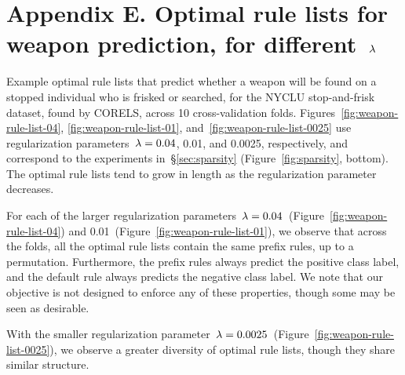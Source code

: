 \section*{Appendix E. Optimal rule lists for weapon prediction, for different~${\lambda}$}

Example optimal rule lists that predict whether a weapon will be found on a
stopped individual who is frisked or searched, for the NYCLU stop-and-frisk dataset,
found by CORELS, across 10 cross-validation folds.
%
Figures~\ref{fig:weapon-rule-list-04}, \ref{fig:weapon-rule-list-01}, and~\ref{fig:weapon-rule-list-0025}
use regularization parameters~${{\lambda} = 0.04}$, 0.01, and 0.0025, respectively,
and correspond to the experiments in~\S\ref{sec:sparsity} (Figure~\ref{fig:sparsity}, bottom).
%
The optimal rule lists tend to grow in length as the regularization parameter decreases.

For each of the larger regularization parameters~${{\lambda} = 0.04}$~(Figure~\ref{fig:weapon-rule-list-04})
and 0.01~(Figure~\ref{fig:weapon-rule-list-01}), we observe that across the folds,
all the optimal rule lists contain the same prefix rules, up to a permutation.
%
Furthermore, the prefix rules always predict the positive class label,
and the default rule always predicts the negative class label.
%
We note that our objective is not designed to enforce any of these properties,
though some may be seen as desirable.

With the smaller regularization parameter~${{\lambda} = 0.0025}$~(Figure~\ref{fig:weapon-rule-list-0025}),
we observe a greater diversity of optimal rule lists, though they share similar structure.

